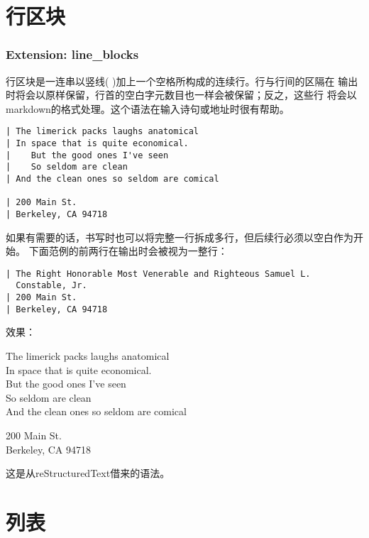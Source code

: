 \documentclass[fancyhdr,bookmark]{ctexbook}
\begin{document}
\section{行区块}\label{ux884cux533aux5757}

\subsubsection{Extension: line\_blocks}\label{extension-line_blocks}

行区块是一连串以竖线(
\textbar{})加上一个空格所构成的连续行。行与行间的区隔在
输出时将会以原样保留，行首的空白字元数目也一样会被保留；反之，这些行
将会以markdown的格式处理。这个语法在输入诗句或地址时很有帮助。

\begin{lstlisting}
| The limerick packs laughs anatomical
| In space that is quite economical.
|    But the good ones I've seen
|    So seldom are clean
| And the clean ones so seldom are comical

| 200 Main St.
| Berkeley, CA 94718
\end{lstlisting}

如果有需要的话，书写时也可以将完整一行拆成多行，但后续行必须以空白作为开始。
下面范例的前两行在输出时会被视为一整行：

\begin{lstlisting}
| The Right Honorable Most Venerable and Righteous Samuel L.
  Constable, Jr.
| 200 Main St.
| Berkeley, CA 94718
\end{lstlisting}

效果：

The limerick packs laughs anatomical\\
In space that is quite economical.\\
\hspace*{0.333em}\hspace*{0.333em}\hspace*{0.333em}But the good ones
I've seen\\
\hspace*{0.333em}\hspace*{0.333em}\hspace*{0.333em}So seldom are clean\\
And the clean ones so seldom are comical

200 Main St.\\
Berkeley, CA 94718

这是从reStructuredText借来的语法。

\section{列表}\label{ux5217ux8868}
\end{document}

